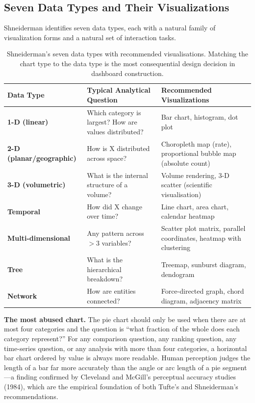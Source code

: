 \subsection{Seven Data Types and Their Visualizations}
\label{subsec:seven-types}

Shneiderman identifies seven data types, each with a natural family
of visualization forms and a natural set of interaction tasks.

\begin{table}[htbp]
\centering
\renewcommand{\arraystretch}{1.4}
\begin{tabular}{lp{3.6cm}p{4.2cm}}
  \toprule
  \textbf{Data Type} & \textbf{Typical Analytical Question}
    & \textbf{Recommended Visualizations} \\
  \midrule
  \textbf{1-D (linear)}
    & Which category is largest? How are values distributed?
    & Bar chart, histogram, dot plot \\
  \textbf{2-D (planar/geographic)}
    & How is X distributed across space?
    & Choropleth map (rate), proportional bubble map (absolute count) \\
  \textbf{3-D (volumetric)}
    & What is the internal structure of a volume?
    & Volume rendering, 3-D scatter (scientific visualisation) \\
  \textbf{Temporal}
    & How did X change over time?
    & Line chart, area chart, calendar heatmap \\
  \textbf{Multi-dimensional}
    & Any pattern across $>$3 variables?
    & Scatter plot matrix, parallel coordinates, heatmap with clustering \\
  \textbf{Tree}
    & What is the hierarchical breakdown?
    & Treemap, sunburst diagram, dendogram \\
  \textbf{Network}
    & How are entities connected?
    & Force-directed graph, chord diagram, adjacency matrix \\
  \bottomrule
\end{tabular}
\caption{Shneiderman's seven data types with recommended visualisations.
         Matching the chart type to the data type is the most consequential
         design decision in dashboard construction.}
\label{tab:seven-types}
\end{table}

\textbf{The most abused chart.} The pie chart should only be used when
there are at most four categories and the question is ``what fraction of
the whole does each category represent?'' For any comparison question,
any ranking question, any time-series question, or any analysis with
more than four categories, a horizontal bar chart ordered by value
is always more readable. Human perception judges the length of a bar
far more accurately than the angle or arc length of a pie segment---a
finding confirmed by Cleveland and McGill's perceptual accuracy studies
(1984), which are the empirical foundation of both Tufte's and
Shneiderman's recommendations.

